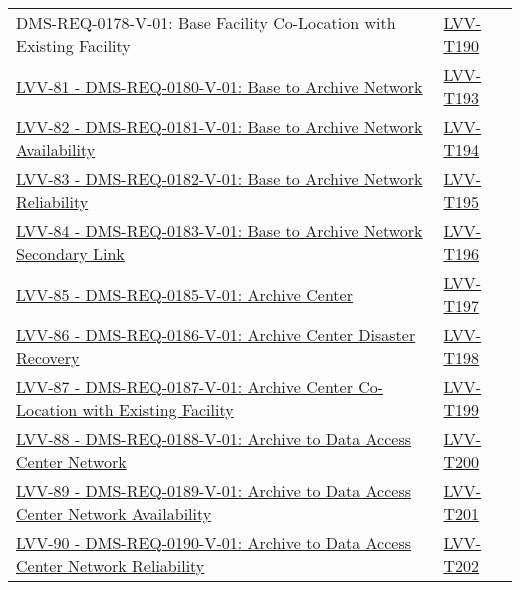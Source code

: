 \begin{longtable}[]{p{13cm}p{3cm}}
{DMS-REQ-0178-V-01: Base Facility Co-Location with Existing Facility} &
\protect\hyperlink{lvv-t190---verify-implementation-of-base-facility-co-location-with-existing-facility-dms-req-0178}{LVV-T190}\tabularnewline
\href{https://jira.lsstcorp.org/browse/LVV-81}{LVV-81 -
DMS-REQ-0180-V-01: Base to Archive Network} &
\protect\hyperlink{lvv-t193---verify-implementation-of-base-to-archive-network-dms-req-0180}{LVV-T193}\tabularnewline
\href{https://jira.lsstcorp.org/browse/LVV-82}{LVV-82 -
DMS-REQ-0181-V-01: Base to Archive Network Availability} &
\protect\hyperlink{lvv-t194---verify-implementation-of-base-to-archive-network-availability-dms-req-0181}{LVV-T194}\tabularnewline
\href{https://jira.lsstcorp.org/browse/LVV-83}{LVV-83 -
DMS-REQ-0182-V-01: Base to Archive Network Reliability} &
\protect\hyperlink{lvv-t195---verify-implementation-of-base-to-archive-network-reliability-dms-req-0182}{LVV-T195}\tabularnewline
\href{https://jira.lsstcorp.org/browse/LVV-84}{LVV-84 -
DMS-REQ-0183-V-01: Base to Archive Network Secondary Link} &
\protect\hyperlink{lvv-t196---verify-implementation-of-base-to-archive-network-secondary-link-dms-req-0183}{LVV-T196}\tabularnewline
\href{https://jira.lsstcorp.org/browse/LVV-85}{LVV-85 -
DMS-REQ-0185-V-01: Archive Center} &
\protect\hyperlink{lvv-t197---verify-implementation-of-archive-center-dms-req-0185}{LVV-T197}\tabularnewline
\href{https://jira.lsstcorp.org/browse/LVV-86}{LVV-86 -
DMS-REQ-0186-V-01: Archive Center Disaster Recovery} &
\protect\hyperlink{lvv-t198---verify-implementation-of--archive-center-disaster-recovery-dms-req-0186}{LVV-T198}\tabularnewline
\href{https://jira.lsstcorp.org/browse/LVV-87}{LVV-87 -
DMS-REQ-0187-V-01: Archive Center Co-Location with Existing Facility} &
\protect\hyperlink{lvv-t199---verify-implementation-of-archive-center-co-location-with-existing-facility-dms-req-0187}{LVV-T199}\tabularnewline
\href{https://jira.lsstcorp.org/browse/LVV-88}{LVV-88 -
DMS-REQ-0188-V-01: Archive to Data Access Center Network} &
\protect\hyperlink{lvv-t200---verify-implementation-of-archive-to-data-access-center-network-dms-req-0188}{LVV-T200}\tabularnewline
\href{https://jira.lsstcorp.org/browse/LVV-89}{LVV-89 -
DMS-REQ-0189-V-01: Archive to Data Access Center Network Availability} &
\protect\hyperlink{lvv-t201---verify-implementation-of-archive-to-data-access-center-network-availability-dms-req-0189}{LVV-T201}\tabularnewline
\href{https://jira.lsstcorp.org/browse/LVV-90}{LVV-90 -
DMS-REQ-0190-V-01: Archive to Data Access Center Network Reliability} &
\protect\hyperlink{lvv-t202---verify-implementation-of-archive-to-data-access-center-network-reliability-dms-req-0190}{LVV-T202}\tabularnewline

\end{longtable}
